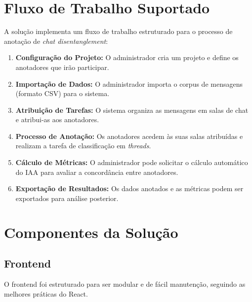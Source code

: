 \section{Fluxo de Trabalho Suportado}

A solução implementa um fluxo de trabalho estruturado para o processo de anotação de \textit{chat disentanglement}:

\begin{enumerate}
    \item \textbf{Configuração do Projeto:} O administrador cria um projeto e define os anotadores que irão participar.
    \item \textbf{Importação de Dados:} O administrador importa o corpus de mensagens (formato CSV) para o sistema.
    \item \textbf{Atribuição de Tarefas:} O sistema organiza as mensagens em salas de chat e atribui-as aos anotadores.
    \item \textbf{Processo de Anotação:} Os anotadores acedem às suas salas atribuídas e realizam a tarefa de classificação em \textit{threads}.
    \item \textbf{Cálculo de Métricas:} O administrador pode solicitar o cálculo automático do IAA para avaliar a concordância entre anotadores.
    \item \textbf{Exportação de Resultados:} Os dados anotados e as métricas podem ser exportados para análise posterior.
\end{enumerate}

\section{Componentes da Solução}

\subsection{Frontend}

O frontend foi estruturado para ser modular e de fácil manutenção, seguindo as melhores práticas do React.

